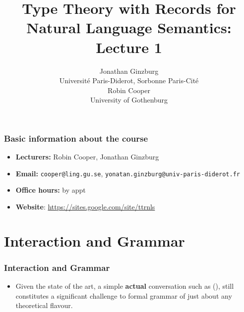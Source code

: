 \documentclass{beamer}
\title{Type Theory with Records for Natural Language Semantics:\\
  Lecture 1           }
\author{Jonathan Ginzburg\\
Universit\'e Paris-Diderot, Sorbonne Paris-Cit\'e\\
Robin Cooper\\ 
University of Gothenburg}
\date{}
\newcommand{\bit}{\begin{itemize}}
\newcommand{\eit}{\end{itemize}}
\newcommand{\ignore}[1]{}
\begin{document}
\frame[plain]{\titlepage}

\begin{frame}\frametitle{ Basic information about the course      }





\begin{itemize}
\item[] {\bf Lecturers:} Robin Cooper, Jonathan Ginzburg



\item[] {\bf Email:} {\tt cooper@ling.gu.se}, {\tt yonatan.ginzburg@univ-paris-diderot.fr}

\item[] {\bf Office hours:} by appt

\item[] {\bf Website}:  \url{https://sites.google.com/site/ttrnls}



\end{itemize}

\end{frame}

\ignore{
\begin{frame}\frametitle{     The Primacy of  Spoken Language }

\bit

\item Uncontroversial: Spoken language is the primary form of language, both from the
  point of view of language evolution and language acquisition.

\item Controversial: {\bf interaction is built
  into the grammar.}

\eit
\end{frame}
}

\section{Interaction and Grammar}

\begin{frame}\frametitle{ Interaction and Grammar}
\bit
\ignore{\item Few would seriously dispute the importance of studying
conversational interaction. 

\item The dominant paradigms in grammar and semantics have, on the
whole, abstracted away from interaction, viewing it as somebody else's problem.
}
\item Given the state of the art, a simple {\bf actual} conversation such as (), still constitutes a significant
challenge to formal grammar of just about any theoretical
flavour.

\eit
\end{frame}
\end{document}
